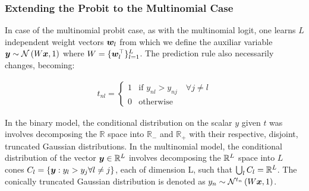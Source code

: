 %
%



\subsubsection{Extending the Probit to the Multinomial Case}
In case of the multinomial probit case, as with the multinomial logit, one learns $L$ independent weight vectors $\bm w_l$ from which we define the auxiliar variable $\bm y \sim \mathcal{N} \left( {W\bm x}, {1} \right)$ where $W = \{ \bm w_l^\top \}_{l=1}^L$. The prediction rule also necessarily changes, becoming:

\begin{align}
t_{nl} = \left\{ \begin{array}{lr} 1 & \text{if } y_{nl} > y_{nj} \quad \forall j \neq l \\ 0 & \text{otherwise} \end{array} \right.
\end{align}

In the binary model, the conditional distribution on the scalar $y$ given $t$ was involves decomposing the $\mathbb{R}$ space into $\mathbb{R}_-$ and $\mathbb{R}_+$ with their respective, disjoint, truncated Gaussian distributions. In the multinomial model, the conditional distribution of the vector $\bm y \in { \mathbb{R}^{L} }$ involves decomposing the ${ \mathbb{R}^{L} }$ space into $L$ cones $C_l = \{ \bm y : y_l > y_j \forall l \neq j \}$, each of dimension L, such that $\bigcup_l C_l = { \mathbb{R}^{L} }$. The conically truncated Gaussian distribution is denoted as $y_n \sim \mathcal{N}^{t_n}\left(W\bm x, 1\right)$. 

